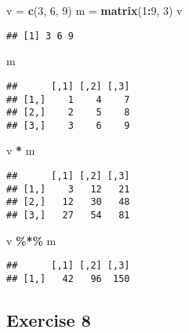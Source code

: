 \documentclass[
]{article}
\newenvironment{Shaded}{\begin{snugshade}}{\end{snugshade}}
\newcommand{\DecValTok}[1]{\textcolor[rgb]{0.00,0.00,0.81}{#1}}
\newcommand{\KeywordTok}[1]{\textcolor[rgb]{0.13,0.29,0.53}{\textbf{#1}}}
\newcommand{\NormalTok}[1]{#1}
\newcommand{\OperatorTok}[1]{\textcolor[rgb]{0.81,0.36,0.00}{\textbf{#1}}}
\newcommand{\StringTok}[1]{\textcolor[rgb]{0.31,0.60,0.02}{#1}}
\begin{document}
\begin{Shaded}
\begin{Highlighting}[]
\NormalTok{v =}\StringTok{ }\KeywordTok{c}\NormalTok{(}\DecValTok{3}\NormalTok{, }\DecValTok{6}\NormalTok{, }\DecValTok{9}\NormalTok{)}
\NormalTok{m =}\StringTok{ }\KeywordTok{matrix}\NormalTok{(}\DecValTok{1}\OperatorTok{:}\DecValTok{9}\NormalTok{, }\DecValTok{3}\NormalTok{)}
\NormalTok{v}
\end{Highlighting}
\end{Shaded}

\begin{verbatim}
## [1] 3 6 9
\end{verbatim}

\begin{Shaded}
\begin{Highlighting}[]
\NormalTok{m}
\end{Highlighting}
\end{Shaded}

\begin{verbatim}
##      [,1] [,2] [,3]
## [1,]    1    4    7
## [2,]    2    5    8
## [3,]    3    6    9
\end{verbatim}

\begin{Shaded}
\begin{Highlighting}[]
\NormalTok{v }\OperatorTok{*}\StringTok{ }\NormalTok{m}
\end{Highlighting}
\end{Shaded}

\begin{verbatim}
##      [,1] [,2] [,3]
## [1,]    3   12   21
## [2,]   12   30   48
## [3,]   27   54   81
\end{verbatim}

\begin{Shaded}
\begin{Highlighting}[]
\NormalTok{v }\OperatorTok{\%*\%}\StringTok{ }\NormalTok{m}
\end{Highlighting}
\end{Shaded}

\begin{verbatim}
##      [,1] [,2] [,3]
## [1,]   42   96  150
\end{verbatim}

\hypertarget{exercise-8}{%
\subsection{Exercise 8}\label{exercise-8}}
\end{document}
